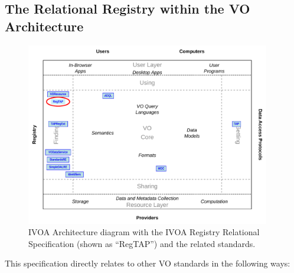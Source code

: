 \documentclass[11pt,a4paper]{ivoa}
\begin{document}
\subsection{The Relational Registry within the VO Architecture}

\label{rolewithinivoa}


\begin{figure}[th]
\begin{center}
\includegraphics[width=0.95\textwidth]{role_diagram.pdf}
\end{center}

\caption{IVOA Architecture
diagram with the IVOA Registry Relational Specification (shown as
``RegTAP'') and the related standards.}
\end{figure}

This specification directly relates to other VO standards in the
following ways:
\end{document}
